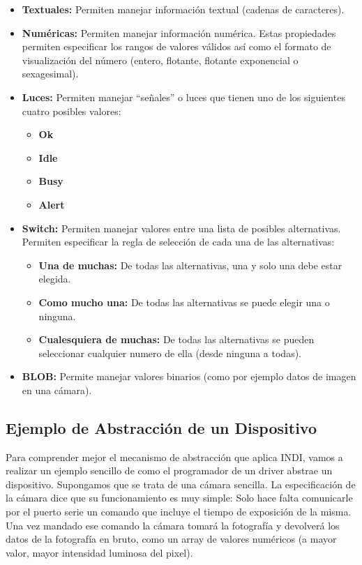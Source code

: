 \begin{itemize}
 \item \textbf{Textuales:} Permiten manejar información textual (cadenas de caracteres).
 
 \item \textbf{Numéricas:} Permiten manejar información numérica. Estas propiedades permiten especificar los rangos de valores válidos así como el formato de visualización del número (entero, flotante, flotante exponencial o sexagesimal).
 
 \item \textbf{Luces:} Permiten manejar ``señales'' o luces que tienen uno de los siguientes cuatro posibles valores:
   \begin{itemize}
     \item \textbf{Ok}
     \item \textbf{Idle}
     \item \textbf{Busy}
     \item \textbf{Alert}
   \end{itemize}


 \item \textbf{Switch:} Permiten manejar valores entre una lista de posibles alternativas. Permiten especificar la regla de selección de cada una de las alternativas:
   \begin{itemize}
     \item \textbf{Una de muchas:} De todas las alternativas, una y solo una debe estar elegida.
     \item \textbf{Como mucho una:} De todas las alternativas se puede elegir una o ninguna.
     \item \textbf{Cualesquiera de muchas:} De todas las alternativas se pueden seleccionar cualquier numero de ella (desde ninguna a todas).

   \end{itemize}
 \item \textbf{BLOB:} Permite manejar valores binarios (como por ejemplo datos de imagen en una cámara).

\end{itemize}



\subsection{Ejemplo de Abstracción de un Dispositivo}

Para comprender mejor el mecanismo de abstracción que aplica INDI, vamos a realizar un ejemplo sencillo de como el programador de un driver abstrae un dispositivo. Supongamos que se trata de una cámara sencilla. La especificación de la cámara dice que su funcionamiento es muy simple: Solo hace falta comunicarle por el puerto serie un comando que incluye el tiempo de exposición de la misma. Una vez mandado ese comando la cámara tomará la fotografía y devolverá los datos de la fotografía en bruto, como un array de valores numéricos (a mayor valor, mayor intensidad luminosa del pixel).

